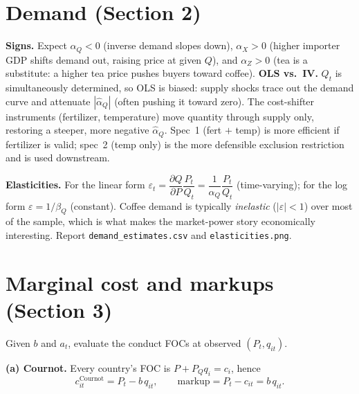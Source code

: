 \documentclass[11pt]{article}
\newcommand{\1}{\mathbf{1}}
\begin{document}
\section{Demand (Section 2)}
\textbf{Signs.} Expect $\alpha_Q<0$ (inverse demand slopes down), $\alpha_X>0$
(higher importer GDP shifts demand out, raising price at given $Q$), and
$\alpha_Z>0$ (tea is a substitute: a higher tea price pushes buyers toward
coffee). \textbf{OLS vs.\ IV.} $Q_t$ is simultaneously determined, so OLS is
biased: supply shocks trace out the demand curve and attenuate $|\hat\alpha_Q|$
(often pushing it toward zero). The cost-shifter instruments (fertilizer,
temperature) move quantity through supply only, restoring a steeper, more
negative $\hat\alpha_Q$. Spec~1 (fert $+$ temp) is more efficient if fertilizer is
valid; spec~2 (temp only) is the more defensible exclusion restriction and is used
downstream.

\textbf{Elasticities.} For the linear form
$\varepsilon_t=\dfrac{\partial Q}{\partial P}\dfrac{P_t}{Q_t}=\dfrac{1}{\alpha_Q}\dfrac{P_t}{Q_t}$
(time-varying); for the log form $\varepsilon=1/\beta_Q$ (constant). Coffee demand
is typically \emph{inelastic} ($|\varepsilon|<1$) over most of the sample, which is
what makes the market-power story economically interesting. Report
\texttt{demand\_estimates.csv} and \texttt{elasticities.png}.

\section{Marginal cost and markups (Section 3)}
Given $b$ and $a_t$, evaluate the conduct FOCs at observed $(P_t,q_{it})$.

\textbf{(a) Cournot.} Every country's FOC is $P+P_Q q_i=c_i$, hence
\begin{equation}
c_{it}^{\text{Cournot}}=P_t-b\,q_{it},\qquad
\text{markup}=P_t-c_{it}=b\,q_{it}.
\end{equation}
\end{document}
